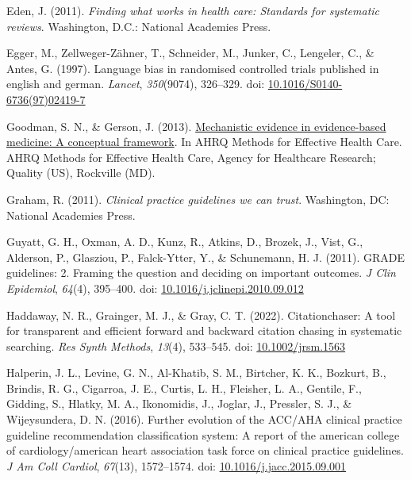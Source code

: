 \documentclass[
  letterpaper,
  DIV=11,
  numbers=noendperiod]{scrreprt}
\newlength{\cslhangindent}
\newlength{\cslentryspacingunit} %
\newenvironment{CSLReferences}[2] %
 {%
  \setlength{\parindent}{0pt}
  \ifodd #1
  \let\oldpar\par
  \def\par{\hangindent=\cslhangindent\oldpar}
  \fi
  \setlength{\parskip}{#2\cslentryspacingunit}
 }%
 {}
\begin{document}
\begin{CSLReferences}{1}{0}
\leavevmode{}%
Eden, J. (2011). \emph{Finding what works in health care: Standards for
systematic reviews}. Washington, D.C.: National Academies Press.

\leavevmode{}%
Egger, M., Zellweger-Zähner, T., Schneider, M., Junker, C., Lengeler,
C., \& Antes, G. (1997). Language bias in randomised controlled trials
published in english and german. \emph{Lancet}, \emph{350}(9074),
326--329. doi:
\href{https://doi.org/10.1016/S0140-6736(97)02419-7}{10.1016/S0140-6736(97)02419-7}

\leavevmode{}%
Goodman, S. N., \& Gerson, J. (2013).
\href{https://www.ncbi.nlm.nih.gov/pubmed/24027800}{Mechanistic evidence
in evidence-based medicine: A conceptual framework}. In AHRQ Methods for
Effective Health Care. AHRQ Methods for Effective Health Care, Agency
for Healthcare Research; Quality (US), Rockville (MD).

\leavevmode{}%
Graham, R. (2011). \emph{Clinical practice guidelines we can trust}.
Washington, DC: National Academies Press.

\leavevmode{}%
Guyatt, G. H., Oxman, A. D., Kunz, R., Atkins, D., Brozek, J., Vist, G.,
Alderson, P., Glasziou, P., Falck-Ytter, Y., \& Schunemann, H. J.
(2011). GRADE guidelines: 2. Framing the question and deciding on
important outcomes. \emph{J Clin Epidemiol}, \emph{64}(4), 395--400.
doi:
\href{https://doi.org/10.1016/j.jclinepi.2010.09.012}{10.1016/j.jclinepi.2010.09.012}

\leavevmode{}%
Haddaway, N. R., Grainger, M. J., \& Gray, C. T. (2022). Citationchaser:
A tool for transparent and efficient forward and backward citation
chasing in systematic searching. \emph{Res Synth Methods}, \emph{13}(4),
533--545. doi:
\href{https://doi.org/10.1002/jrsm.1563}{10.1002/jrsm.1563}

\leavevmode{}%
Halperin, J. L., Levine, G. N., Al-Khatib, S. M., Birtcher, K. K.,
Bozkurt, B., Brindis, R. G., Cigarroa, J. E., Curtis, L. H., Fleisher,
L. A., Gentile, F., Gidding, S., Hlatky, M. A., Ikonomidis, J., Joglar,
J., Pressler, S. J., \& Wijeysundera, D. N. (2016). Further evolution of
the ACC/AHA clinical practice guideline recommendation classification
system: A report of the american college of cardiology/american heart
association task force on clinical practice guidelines. \emph{J Am Coll
Cardiol}, \emph{67}(13), 1572--1574. doi:
\href{https://doi.org/10.1016/j.jacc.2015.09.001}{10.1016/j.jacc.2015.09.001}


\end{CSLReferences}
\end{document}
